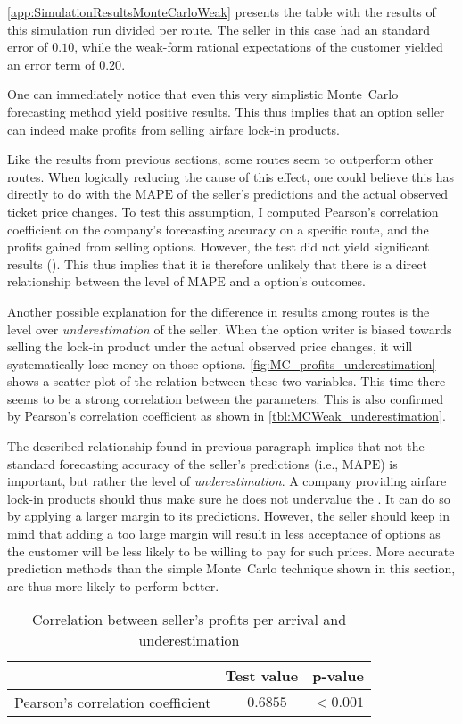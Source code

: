 \autoref{app:SimulationResultsMonteCarloWeak} presents the table with the results of this simulation run divided per route. The seller in this case had an standard error of $0.10$, while the weak-form rational expectations of the customer yielded an error term of $0.20$.

One can immediately notice that even this very simplistic Monte~Carlo forecasting method yield positive results. This thus implies that an option seller can indeed make profits from selling airfare lock-in products.

Like the results from previous sections, some routes seem to outperform other routes. When logically reducing the cause of this effect, one could believe this has directly to do with the $\mbox{MAPE}$ of the seller's predictions and the actual observed ticket price changes. To test this assumption, I computed Pearson's correlation coefficient on the company's forecasting accuracy on a specific route, and the profits gained from selling options. However, the test did not yield significant results (). This thus implies that it is therefore unlikely that there is a direct relationship between the level of $\mbox{MAPE}$ and a option's outcomes.

Another possible explanation for the difference in results among routes is the level over \emph{underestimation} of the seller. When the option writer is biased towards selling the lock-in product under the actual observed price changes, it will systematically lose money on those options. \autoref{fig:MC_profits_underestimation} shows a scatter plot of the relation between these two variables. This time there seems to be a strong correlation between the parameters. This is also confirmed by Pearson's correlation coefficient as shown in \autoref{tbl:MCWeak_underestimation}.

The described relationship found in previous paragraph implies that not the standard forecasting accuracy of the seller's predictions (i.e., $\mbox{MAPE}$) is important, but rather the level of \emph{underestimation}. A company providing airfare lock-in products should thus make sure he does not undervalue the . It can do so by applying a larger margin to its predictions. However, the seller should keep in mind that adding a too large margin will result in less acceptance of options as the customer will be less likely to be willing to pay for such prices. More accurate prediction methods than the simple Monte~Carlo technique shown in this section, are thus more likely to perform better.


\begin{table}
\centering
\begin{tabular}{l c c}
\toprule
~  &  Test value  &  p-value  \\
\midrule
Pearson's correlation coefficient   &  $-0.6855$   &  $< 0.001$ \\
\bottomrule
\end{tabular}
\caption{Correlation between seller's profits per arrival and underestimation}
\label{tbl:MCWeak_underestimation}
\end{table}



